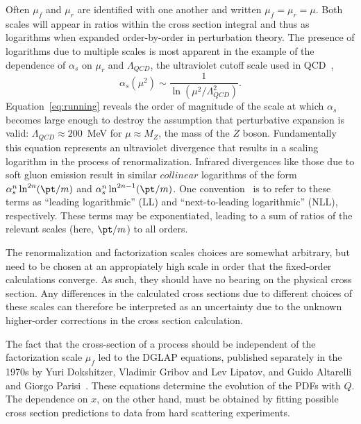 Often $\mu_f$ and $\mu_r$ are identified with one another and written $\mu_f = \mu_r = \mu$. Both scales will appear in ratios within the cross section integral and thus as logarithms when expanded order-by-order in perturbation theory. The presence of logarithms due to multiple scales is most apparent in the example of the dependence of $\alpha_s$ on $\mu_r$ and $\Lambda_{QCD}$, the ultraviolet cutoff scale used in QCD~\cite{LambdaQCD},
\begin{equation}
\alpha_s(\mu^2) \sim  \frac{1}{\ln(\mu^2/\Lambda^2_{QCD})}.
 \label{eq:running}
\end{equation}
%
Equation~\ref{eq:running} reveals the order of magnitude of the scale at which $\alpha_s$ becomes large enough to destroy the assumption that perturbative expansion is valid: $\Lambda_{QCD} \approx 200$~MeV for  $\mu \approx M_Z$, the mass of the $Z$ boson.  Fundamentally this equation represents an ultraviolet divergence that results in a scaling logarithm in the process of renormalization. Infrared divergences like those due to soft gluon emission result in similar $collinear$ logarithms of the form $\alpha^n_s \ln^{2n}(\pt / m)$ and $\alpha^n_s \ln^{2n-1}(\pt / m)$.  One convention~\cite{0954-3899-30-5-R01} 
is to refer to these terms as ``leading logarithmic'' (LL) and ``next-to-leading logarithmic'' (NLL), respectively. These terms may be exponentiated, leading to a sum of ratios of the relevant scales (here, $\pt / m$) to all orders.

The renormalization and factorization scales choices are somewhat arbitrary, but need to be chosen at an appropiately high scale in order that the fixed-order calculations converge. As such, they should have no bearing on the physical cross section. Any differences in the calculated cross  sections due to different choices of these scales can therefore be interpreted as an uncertainty due to the unknown higher-order corrections in the cross section calculation.


The fact that the cross-section of a process should be independent of the factorization scale $\mu_f$  led to the  DGLAP equations, published separately in the 1970s by Yuri Dokshitzer, Vladimir Gribov and Lev Lipatov, and Guido Altarelli and Giorgo Parisi~\cite{Altarelli1977298}. These equations determine the evolution of the PDFs with $Q$. %
The dependence on $x$, on the other hand, must be obtained by fitting possible cross section predictions to data from hard scattering experiments.

